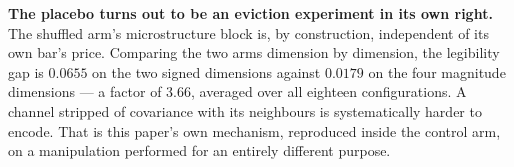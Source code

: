 \textbf{The placebo turns out to be an eviction experiment in its own right.} The shuffled arm's
microstructure block is, by construction, independent of its own bar's price. Comparing the two
arms dimension by dimension, the legibility gap is $0.0655$ on the two signed dimensions against
$0.0179$ on the four magnitude dimensions --- a factor of $3.66$, averaged over all eighteen
configurations. A channel stripped of covariance with its neighbours is systematically harder to
encode. That is this paper's own mechanism, reproduced inside the control arm, on a manipulation
performed for an entirely different purpose.

